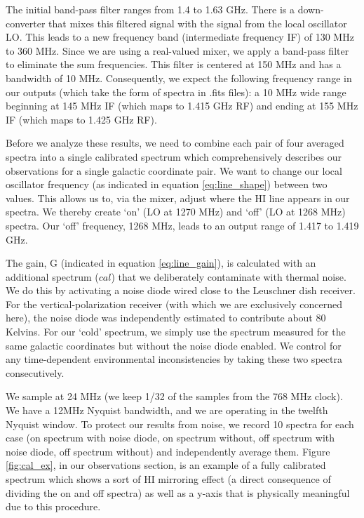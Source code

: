 \documentclass[12pt]{article}
\begin{document}
The initial band-pass filter ranges from 1.4 to 1.63 GHz. There is a down-converter that mixes this filtered signal with the signal from the local oscillator LO. This leads to a new frequency band (intermediate frequency IF) of 130 MHz to 360 MHz. Since we are using a real-valued mixer, we apply a band-pass filter to eliminate the sum frequencies. This filter is centered at 150 MHz and has a bandwidth of 10 MHz. Consequently, we expect the following frequency range in our outputs (which take the form of spectra in .fits files): a 10 MHz wide range beginning at 145 MHz IF (which maps to 1.415 GHz RF) and ending at 155 MHz IF (which maps to 1.425 GHz RF).

Before we analyze these results, we need to combine each pair of four averaged spectra into a single calibrated spectrum which comprehensively describes our observations for a single galactic coordinate pair. We want to change our local oscillator frequency (as indicated in equation \ref{eq:line_shape}) between two values. This allows us to, via the mixer, adjust where the HI line appears in our spectra. We thereby create `on' (LO at 1270 MHz) and `off' (LO at 1268 MHz) spectra. Our `off' frequency, 1268 MHz, leads to an output range of 1.417 to 1.419 GHz. 

The gain, G (indicated in equation \ref{eq:line_gain}), is calculated with an additional spectrum ($cal$) that we deliberately contaminate with thermal noise. We do this by activating a noise diode wired close to the Leuschner dish receiver. For the vertical-polarization receiver (with which we are exclusively concerned here), the noise diode was independently estimated to contribute about 80 Kelvins. For our `cold' spectrum, we simply use the spectrum measured for the same galactic coordinates but without the noise diode enabled. We control for any time-dependent environmental inconsistencies by taking these two spectra consecutively.

We sample at 24 MHz (we keep 1/32 of the samples from the 768 MHz clock). We have a 12MHz Nyquist bandwidth, and we are operating in the twelfth Nyquist window. To protect our results from noise, we record 10 spectra for each case (on spectrum with noise diode, on spectrum without, off spectrum with noise diode, off spectrum without) and independently average them. Figure \ref{fig:cal_ex}, in our observations section, is an example of a fully calibrated spectrum which shows a sort of HI mirroring effect (a direct consequence of dividing the on and off spectra) as well as a y-axis that is physically meaningful due to this procedure.
\end{document}
